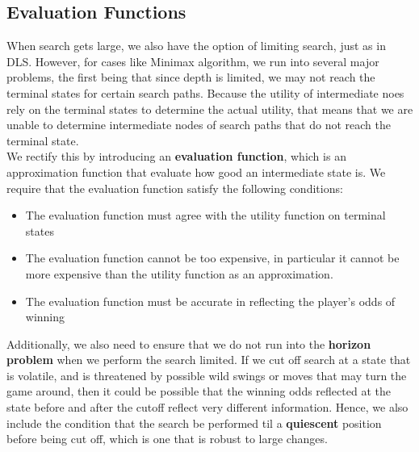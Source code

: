 \documentclass[12pt]{article}
\begin{document}
\subsection{Evaluation Functions}

When search gets large, we also have the option of limiting search, just as in DLS. However, for cases like Minimax algorithm, we run into several major problems, the first being that since depth is limited, we may not reach the terminal states for certain search paths. Because the utility of intermediate noes rely on the terminal states to determine the actual utility, that means that we are unable to determine intermediate nodes of search paths that do not reach the terminal state.\\

We rectify this by introducing an \textbf{evaluation function}, which is an approximation function that evaluate how good an intermediate state is. We require that the evaluation function satisfy the following conditions:

\begin{itemize}
\item The evaluation function must agree with the utility function on terminal states
\item The evaluation function cannot be too expensive, in particular it cannot be more expensive than the utility function as an approximation. 
\item The evaluation function must be accurate in reflecting the player's odds of winning
\end{itemize}

Additionally, we also need to ensure that we do not run into the \textbf{horizon problem} when we perform the search limited. If we cut off search at a state that is volatile, and is threatened by possible wild swings or moves that may turn the game around, then it could be possible that the winning odds reflected at the state before and after the cutoff reflect very different information. Hence, we also include the condition that the search be performed til a \textbf{quiescent} position before being cut off, which is one that is robust to large changes.
\end{document}
